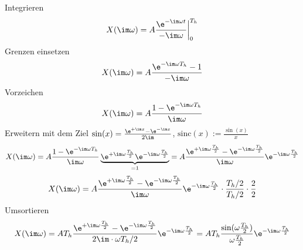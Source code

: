 \begin{ExCalc}
Integrieren
\begin{equation}
X(\im \omega) = A \frac{\e^{-\im \omega t}}{-\im \omega} \bigg|_{0}^{T_h}
\end{equation}
Grenzen einsetzen
\begin{equation}
X(\im \omega) = A \frac{\e^{-\im \omega T_h}-1}{-\im \omega}
\end{equation}
Vorzeichen
\begin{equation}
X(\im \omega) = A \frac{1 - \e^{-\im \omega T_h}}{\im \omega}
\end{equation}
Erweitern mit dem Ziel $\sin(x) = \frac{\e^{+\im x}-\e^{-\im x}}{2\im}$, $\mathrm{sinc}(x):=\frac{\sin(x)}{x}$
\begin{equation}
X(\im \omega) = A \frac{1 - \e^{-\im \omega T_h}}{\im \omega} \underbrace{\e^{+\im\omega\frac{T_h}{2}} \e^{-\im\omega\frac{T_h}{2}}}_{=1}=
A \frac{\e^{+\im\omega\frac{T_h}{2}} - \e^{-\im\omega\frac{T_h}{2}}}{\im\omega} \e^{-\im\omega\frac{T_h}{2}}
\end{equation}
\begin{equation}
X(\im \omega) = A \frac{\e^{+\im\omega\frac{T_h}{2}} - \e^{-\im\omega\frac{T_h}{2}}}{\im\omega} \e^{-\im\omega\frac{T_h}{2}}
\cdot \frac{T_h/2}{T_h/2} \cdot \frac{2}{2}
\end{equation}
Umsortieren
\begin{equation}
X(\im \omega) = A T_h \frac{\e^{+\im\omega\frac{T_h}{2}} - \e^{-\im\omega\frac{T_h}{2}}}{2 \im \cdot \omega T_h/2} \e^{-\im\omega\frac{T_h}{2}} =
A T_h \frac{\sin(\omega\frac{T_h}{2})}{\omega\frac{T_h}{2}} \e^{-\im\omega\frac{T_h}{2}}
\end{equation}
\end{ExCalc}


